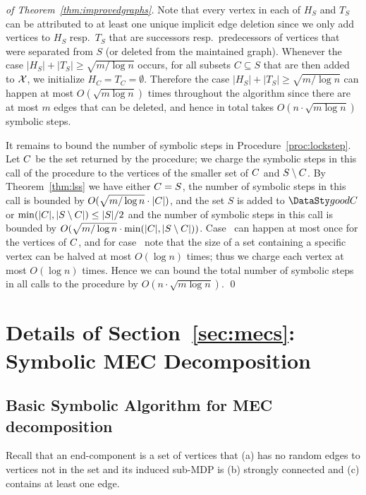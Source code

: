 \begin{proof}[of Theorem~\ref{thm:improvedgraphs}]
    Note that every vertex in each
    of $H_S$ and $T_S$ can be attributed to at least one unique implicit edge deletion 
    since we only add vertices to $H_S$ resp.\ $T_S$ that are successors resp.\ 
    predecessors of vertices that were separated from $S$ 
    (or deleted from the maintained graph).
    Whenever the case $\lvert H_S \rvert + \lvert T_S \rvert \ge \sqrt{m / \log{n}}$
    occurs, for all subsets $C \subseteq S$ that are then added to
    $\mathcal{X}$, we initialize $H_C = T_C = \emptyset$. Therefore the
    case $\lvert H_S \rvert + \lvert T_S \rvert \ge \sqrt{m / \log{n}}$ can
    happen at most $O(\sqrt{m \log{n}})$ times throughout the algorithm since
    there are at most $m$ edges that can be deleted, and hence in total
    takes $O(n \cdot \sqrt{m \log{n}})$ symbolic steps.
	
	It remains to bound the number of symbolic steps in
	Procedure~\ref{proc:lockstep}. Let $C$ be the set returned by the procedure;
	we charge the symbolic steps in this call of the procedure to the vertices of 
	the smaller set of $C$ and $S \setminus C$.
	By Theorem~\ref{thm:lss} we have either 
	$C = S$, the number of symbolic steps in this call is 
	bounded by $O(\sqrt{m/\log{n}} \cdot \lvert C \rvert)$, and the set $S$ is added to $\goodC$ or
	\upbr{b} $\min(\lvert C \rvert, \lvert S \setminus 
	C \rvert) \le \lvert S \rvert / 2$ and the
	number of symbolic steps in this call is 
	bounded by $O(\sqrt{m/\log{n}} \cdot \min(\lvert C \rvert, \lvert S \setminus 
	C \rvert))$.
	Case~ can happen at most once for the vertices of $C$,
	and for case~ note that the size of a set containing a specific vertex 
	can be halved at most $O(\log{n})$ times; thus we charge each vertex at 
	most $O(\log{n})$ times. Hence we can bound the total number of symbolic
	steps in all calls to the procedure by $O(n \cdot \sqrt{m \log{n}})$.
    \qed

\end{proof}


\section{Details of Section~\ref{sec:mecs}: Symbolic MEC Decomposition}\label{sec:appmecs}

\subsection{Basic Symbolic Algorithm for MEC decomposition}
Recall that an end-component is a set of vertices that (a) has no 
random edges to vertices not in the set and its induced sub-MDP
is (b) strongly connected and (c) contains at least one edge.

